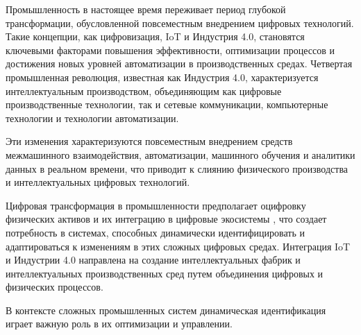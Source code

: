 \Introduction

Промышленность в настоящее время переживает период глубокой трансформации,
обусловленной повсеместным внедрением цифровых технологий. Такие концепции, как
цифровизация, IoT и
Индустрия 4.0, становятся ключевыми факторами повышения эффективности,
оптимизации процессов и достижения новых уровней автоматизации в
производственных средах.\cite{iotoverview} Четвертая промышленная революция,
известная как Индустрия 4.0, характеризуется интеллектуальным производством,
объединяющим как цифровые производственные технологии, так и сетевые
коммуникации, компьютерные технологии и технологии автоматизации.

Эти изменения характеризуются повсеместным внедрением средств межмашинного
взаимодействия, автоматизации, машинного обучения и аналитики данных в реальном
времени, что приводит к слиянию физического производства и интеллектуальных
цифровых технологий.

Цифровая трансформация в промышленности предполагает оцифровку физических
активов и их интеграцию в цифровые экосистемы \cite{iotoverview}, что создает
потребность в системах, способных динамически идентифицировать и адаптироваться
к изменениям в этих сложных цифровых средах. Интеграция IoT и Индустрии 4.0
направлена на создание интеллектуальных фабрик и интеллектуальных
производственных сред путем объединения цифровых и физических процессов.

В контексте сложных промышленных систем динамическая идентификация играет важную
роль в их оптимизации и управлении.


